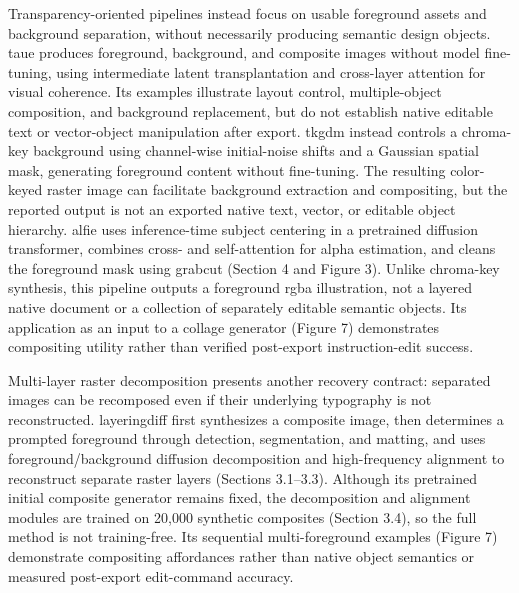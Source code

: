 Transparency-oriented pipelines instead focus on usable foreground assets and background separation, without necessarily producing semantic design objects.
\ac{taue} produces foreground, background, and composite images without model fine-tuning, using intermediate latent transplantation and cross-layer attention for visual coherence.
Its examples illustrate layout control, multiple-object composition, and background replacement, but do not establish native editable text or vector-object manipulation after export.
\ac{tkgdm} instead controls a chroma-key background using channel-wise initial-noise shifts and a Gaussian spatial mask, generating foreground content without fine-tuning.
The resulting color-keyed raster image can facilitate background extraction and compositing, but the reported output is not an exported native text, vector, or editable object hierarchy.
\ac{alfie} uses inference-time subject centering in a pretrained diffusion transformer, combines cross- and self-attention for alpha estimation, and cleans the foreground mask using \ac{grabcut} (Section 4 and Figure 3).
Unlike chroma-key synthesis, this pipeline outputs a foreground \ac{rgba} illustration, not a layered native document or a collection of separately editable semantic objects.
Its application as an input to a collage generator (Figure 7) demonstrates compositing utility rather than verified post-export instruction-edit success.

Multi-layer raster decomposition presents another recovery contract: separated images can be recomposed even if their underlying typography is not reconstructed.
\ac{layeringdiff} first synthesizes a composite image, then determines a prompted foreground through detection, segmentation, and matting, and uses foreground/background diffusion decomposition and high-frequency alignment to reconstruct separate raster layers (Sections 3.1--3.3).
Although its pretrained initial composite generator remains fixed, the decomposition and alignment modules are trained on 20,000 synthetic composites (Section 3.4), so the full method is not training-free.
Its sequential multi-foreground examples (Figure 7) demonstrate compositing affordances rather than native object semantics or measured post-export edit-command accuracy.

